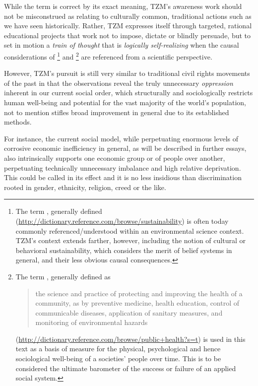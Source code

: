 \documentclass[10pt, a4paper, cleardoubleempty, openright, twoside]{book}
\begin{document}
While the term  is correct by its exact meaning,
TZM's awareness work should not be misconstrued as relating to
culturally common, traditional  actions such
as we have seen historically. Rather, TZM expresses itself through
targeted, rational educational projects that work not to impose, dictate
or blindly persuade, but to set in motion a \emph{train of thought} that
is \emph{logically self-realizing} when the causal considerations of
\footnote{
	The term , generally defined 
	(\url{http://dictionary.reference.com/browse/sustainability}) is often
	today commonly referenced/understood within an environmental science
	context. TZM's context extends farther, however, including the notion
	of cultural or behavioral sustainability, which considers the merit of
	belief systems in general, and their less obvious causal consequences.
}
and \footnote{
	The term , generally defined as
	\blockquote{the science and practice of protecting and improving the
	health of a community, as by preventive medicine, health education,
	control of communicable diseases, application of sanitary measures,
	and monitoring of environmental hazards}
	(\url{http://dictionary.reference.com/browse/public+health?s=t}) is
	used in this text as a basis of measure for the physical,
	psychological and hence sociological well-being of a societies' people
	over time. This is to be considered the ultimate barometer of the
	success or failure of an applied social system.
}
are referenced from a scientific perspective.

However, TZM's pursuit is still very similar to traditional civil rights
movements of the past in that the observations reveal the truly
unnecessary \emph{oppression} inherent in our current social order,
which structurally and sociologically restricts human well-being and
potential for the vast majority of the world's population, not to
mention stifles broad improvement in general due to its established
methods. 
	
For instance, the current social model, while perpetuating enormous
levels of corrosive economic inefficiency in general, as will be
described in further essays, also intrinsically supports one economic
group or  of people over another, perpetuating
technically unnecessary imbalance and high relative deprivation. This
could be called  in its effect and it is no
less insidious than discrimination rooted in gender, ethnicity,
religion, creed or the like.
\end{document}
